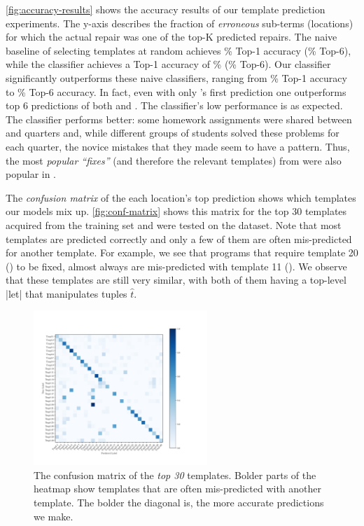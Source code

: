 

%
\autoref{fig:accuracy-results} shows the accuracy results of our template
prediction experiments. The y-axis describes the fraction of \emph{erroneous}
sub-terms (locations) for which the actual repair was one of the top-K predicted
repairs.
%
The naive baseline of selecting templates at random achieves \RandomTopOne\%
Top-1 accuracy (\RandomTopSix\% Top-6), while the \popular classifier achieves a
Top-1 accuracy of \PopularTopOne\% (\PopularTopSix\% Top-6).
%
Our \dnn classifier significantly outperforms these naive classifiers, ranging
from \DnnTopOne\% Top-1 accuracy to \DnnTopSix\% Top-6 accuracy.
%
In fact, even with only \dnn's first prediction one outperforms top 6
predictions of both \random and \popular.
%
The \random classifier's low performance is as expected.
%
The \popular classifier performs better: some homework assignments were shared
between \SPRING and \FALL quarters and, while different groups of students
solved these problems for each quarter, the novice mistakes that they made seem
to have a pattern. Thus, the most \emph{popular ``fixes''} (and therefore the
relevant templates) from \SPRING were also popular in \FALL.

%
The \emph{confusion matrix} of the each location's top prediction shows which
templates our models mix up.
%
\autoref{fig:conf-matrix} shows this matrix for the top 30 templates acquired
from the \SPRING training set and were tested on the \FALL dataset.
%
Note that most templates are predicted correctly and only a few of them are
often mis-predicted for another template.
%
For example, we see that programs that require template 20
() to be fixed,
almost always are mis-predicted with template 11 (). We observe that these templates are still very
similar, with both of them having a top-level |let| that manipulates tuples
$\hat{t}$.

\begin{figure}[t]
  \centering
  \includegraphics[trim={30 40 100 70},clip,height=2.3in]{evaluation-conf-matrix-no-title.pdf}
  \caption{The confusion matrix of the \emph{top 30} templates. Bolder parts of
  the heatmap show templates that are often mis-predicted with another template.
  The bolder the diagonal is, the more accurate predictions we make.}
  \label{fig:conf-matrix}
\end{figure}

